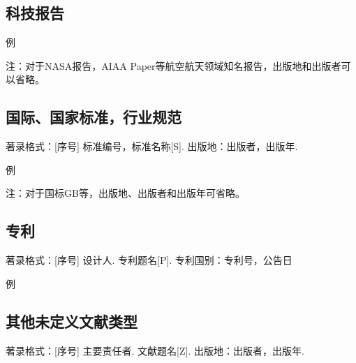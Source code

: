\subsection{科技报告}

例\cite{Kong:89} \cite{Carl:73}

\printbibliography[type=report,title=科技报告格式示例,heading=subbibliography]

注：对于NASA报告，AIAA Paper等航空航天领域知名报告，出版地和出版者可以省略。

\subsection{国际、国家标准，行业规范}

著录格式：[序号]  标准编号，标准名称[S]. 出版地：出版者，出版年.

例\cite{Mile5007d} \cite{gb7713-87}

\printbibliography[filter=standard,title=国际、国家标准，行业规范格式示例,heading=subbibliography]

注：对于国标GB等，出版地、出版者和出版年可省略。

\subsection{专利}

著录格式：[序号]  设计人. 专利题名[P]. 专利国别：专利号，公告日

例\cite{Li:86}

\printbibliography[type=patent,title=专利格式示例,heading=subbibliography]

\subsection{其他未定义文献类型}

著录格式：[序号]  主要责任者. 文献题名[Z]. 出版地：出版者，出版年.
